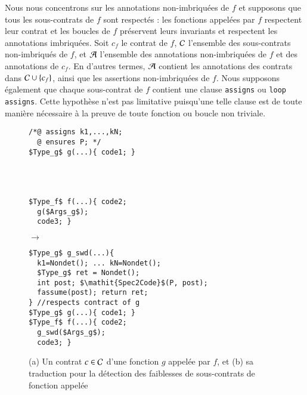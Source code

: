 Nous nous concentrons sur les annotations non-imbriquées de $f$ et supposons que
tous les sous-contrats de $f$ sont respectés : les fonctions appelées par $f$
respectent leur contrat et les boucles de $f$ préservent leurs invariants et
respectent les annotations imbriquées.
Soit $c_f$ le contrat de $f$, ${\mathcal{C}}$ l'ensemble des sous-contrats non-imbriqués
de $f$, et ${\mathcal{A}}$ l'ensemble des annotations non-imbriquées de $f$ et des
annotations de $c_f$.
En d'autres termes, ${\mathcal{A}}$ contient les annotations des contrats dans
${\mathcal{C}}\cup\{c_f\}$, ainsi que les assertions non-imbriquées de $f$.
Nous supposons également que chaque sous-contrat de $f$ contient une clause
\lstinline'assigns' ou \lstinline'loop assigns'.
Cette hypothèse n'est pas limitative puisqu'une telle clause est de toute
manière nécessaire à la preuve de toute fonction ou boucle non triviale.


\begin{figure}[tb]
\begin{center}
\begin{minipage}{0.35\columnwidth}
\begin{lstlisting}[mathescape]
/*@ assigns k1,...,kN;
  @ ensures P; */
$Type_g$ g(...){ code1; }




$Type_f$ f(...){ code2;
  g($Args_g$);
  code3; }
\end{lstlisting}
\end{minipage}
\hspace{-6mm}
\begin{minipage}{0.07\columnwidth}$\to$\end{minipage}
\begin{minipage}{0.35\columnwidth}
\begin{lstlisting}[mathescape]
$Type_g$ g_swd(...){
  k1=Nondet(); ... kN=Nondet();
  $Type_g$ ret = Nondet();
  int post; $\mathit{Spec2Code}$(P, post);
  fassume(post); return ret;
} //respects contract of g
$Type_g$ g(...){ code1; }
$Type_f$ f(...){ code2;
  g_swd($Args_g$);
  code3; }
\end{lstlisting}
\end{minipage}
\vspace{-3mm}
\caption{(a) Un contrat $c\in{\ensuremath\mathcal{C}}$ d'une fonction $g$ appelée par $f$, et
(b) sa traduction pour la détection des faiblesses de sous-contrats de fonction
appelée}
\vspace{-3mm}
\label{fig:CW-transf-functions}
\end{center}
\end{figure}



